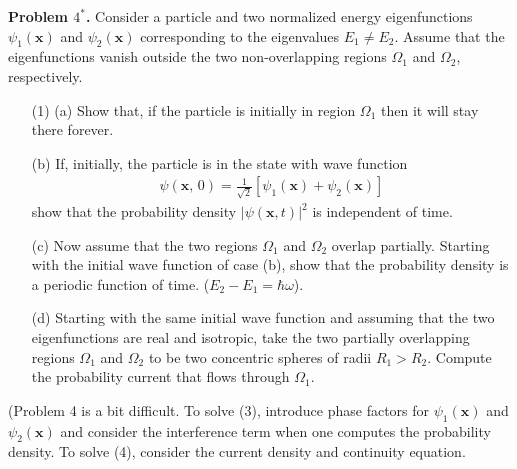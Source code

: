 \documentclass[floatfix,nofootinbib,superscriptaddress,fleqn]{revtex4}
\begin{document}
\noindent \textbf{Problem $4^*$.}
Consider a particle and two normalized energy eigenfunctions
$\psi_1(\bm{x})$ and $\psi_2(\bm{x})$ corresponding to the eigenvalues
$E_1\neq E_2$. Assume that the eigenfunctions vanish outside the two 
non-overlapping regions $\Omega_1$ and $\Omega_2$, respectively. 
\begin{itemize}
\item[(1)] (a) Show that, if the particle is initially in region
  $\Omega_1$ then it will stay there forever. 
\item[(b)] If, initially, the particle is in the state with wave function
\begin{align*}
  \psi(\bm{x},\,0) = \frac1{\sqrt{2}} [\psi_1(\bm{x}) +
  \psi_2(\bm{x})] 
\end{align*}
show that the probability density $|\psi(\bm{x},t)|^2$ is independent
of time. 
\item[(c)] Now assume that the two regions $\Omega_1$ and $\Omega_2$
  overlap partially. Starting with the initial wave function of case
  (b), show that the probability density is a periodic function of 
time. ($E_2-E_1=\hbar \omega$).
\item[(d)] Starting with the same initial wave function and assuming
  that the two eigenfunctions are real and isotropic, take the two
  partially overlapping regions $\Omega_1$ and $\Omega_2$ to be 
two concentric spheres of radii $R_1>R_2$. Compute the probability
current that flows through $\Omega_1$.
\end{itemize}
(Problem 4 is a bit difficult. To solve (3), introduce phase
factors for $\psi_1(\bm{x})$ and $\psi_2(\bm{x})$ and consider the
interference term when one computes the probability density. To solve
(4), consider the current density and continuity equation.  
\end{document}

